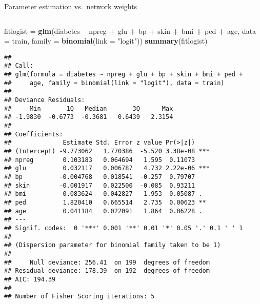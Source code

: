 \documentclass[10pt,ignorenonframetext,]{beamer}
\newenvironment{Shaded}{\begin{snugshade}}{\end{snugshade}}
\newcommand{\DataTypeTok}[1]{\textcolor[rgb]{0.13,0.29,0.53}{#1}}
\newcommand{\KeywordTok}[1]{\textcolor[rgb]{0.13,0.29,0.53}{\textbf{#1}}}
\newcommand{\NormalTok}[1]{#1}
\newcommand{\OperatorTok}[1]{\textcolor[rgb]{0.81,0.36,0.00}{\textbf{#1}}}
\newcommand{\StringTok}[1]{\textcolor[rgb]{0.31,0.60,0.02}{#1}}
\begin{document}
\begin{frame}[fragile]

\begin{block}{Parameter estimation vs.~network weights}

\(~\)

\tiny

\begin{Shaded}
\begin{Highlighting}[]
\NormalTok{fitlogist =}\StringTok{ }\KeywordTok{glm}\NormalTok{(diabetes }\OperatorTok{~}\StringTok{ }\NormalTok{npreg }\OperatorTok{+}\StringTok{ }\NormalTok{glu }\OperatorTok{+}\StringTok{ }\NormalTok{bp }\OperatorTok{+}\StringTok{ }\NormalTok{skin }\OperatorTok{+}\StringTok{ }\NormalTok{bmi }\OperatorTok{+}\StringTok{ }\NormalTok{ped }\OperatorTok{+}\StringTok{ }\NormalTok{age, }
    \DataTypeTok{data =}\NormalTok{ train, }\DataTypeTok{family =} \KeywordTok{binomial}\NormalTok{(}\DataTypeTok{link =} \StringTok{"logit"}\NormalTok{))}
\KeywordTok{summary}\NormalTok{(fitlogist)}
\end{Highlighting}
\end{Shaded}

\begin{verbatim}
## 
## Call:
## glm(formula = diabetes ~ npreg + glu + bp + skin + bmi + ped + 
##     age, family = binomial(link = "logit"), data = train)
## 
## Deviance Residuals: 
##     Min       1Q   Median       3Q      Max  
## -1.9830  -0.6773  -0.3681   0.6439   2.3154  
## 
## Coefficients:
##              Estimate Std. Error z value Pr(>|z|)    
## (Intercept) -9.773062   1.770386  -5.520 3.38e-08 ***
## npreg        0.103183   0.064694   1.595  0.11073    
## glu          0.032117   0.006787   4.732 2.22e-06 ***
## bp          -0.004768   0.018541  -0.257  0.79707    
## skin        -0.001917   0.022500  -0.085  0.93211    
## bmi          0.083624   0.042827   1.953  0.05087 .  
## ped          1.820410   0.665514   2.735  0.00623 ** 
## age          0.041184   0.022091   1.864  0.06228 .  
## ---
## Signif. codes:  0 '***' 0.001 '**' 0.01 '*' 0.05 '.' 0.1 ' ' 1
## 
## (Dispersion parameter for binomial family taken to be 1)
## 
##     Null deviance: 256.41  on 199  degrees of freedom
## Residual deviance: 178.39  on 192  degrees of freedom
## AIC: 194.39
## 
## Number of Fisher Scoring iterations: 5
\end{verbatim}

\end{block}

\end{frame}
\end{document}
